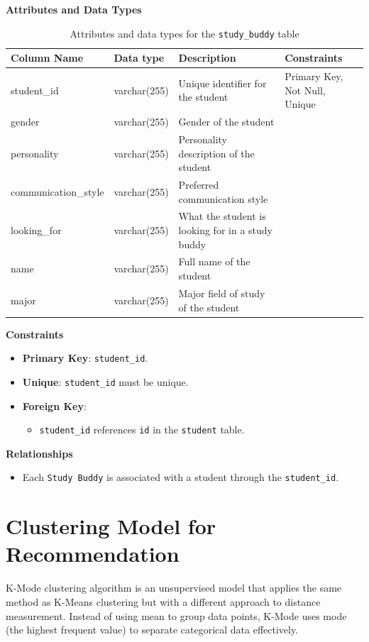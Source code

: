 \documentclass[12pt]{article}
\begin{document}
\textbf{Attributes and Data Types}
\begin{table}[H] 
    \centering 
    \renewcommand{\arraystretch}{1.5} 
    \begin{tabular}{|l|l|p{2.1cm}|l|} 
    \hline 
    \rowcolor[HTML]{96FFFB} 
    \textbf{Column Name} & \textbf{Data type} & \textbf{Description} & \textbf{Constraints} \\ \hline 
    student\_id & varchar(255) & Unique identifier for the student & Primary Key, Not Null, Unique \\ \hline 
    gender & varchar(255) & Gender of the student & \\ \hline 
    personality & varchar(255) & Personality description of the student & \\ \hline 
    communication\_style & varchar(255) & Preferred communication style & \\ \hline 
    looking\_for & varchar(255) & What the student is looking for in a study buddy & \\ \hline 
    name & varchar(255) & Full name of the student & \\ \hline 
    major & varchar(255) & Major field of study of the student & \\ \hline 
    \end{tabular} 
    \caption{Attributes and data types for the \texttt{study\_buddy} table} 
\end{table}

\noindent 
\textbf{Constraints} 
\begin{itemize} 
    \item \textbf{Primary Key}: \texttt{student\_id}. 
    \item \textbf{Unique}: \texttt{student\_id} must be unique. 
    \item \textbf{Foreign Key}: \begin{itemize} 
        \item \texttt{student\_id} references \texttt{id} in the \texttt{student} table. 
    \end{itemize} 
\end{itemize}

\noindent 
\textbf{Relationships} 
\begin{itemize} 
    \item Each \texttt{Study Buddy} is associated with a student through the \texttt{student\_id}. 
\end{itemize}

\pagebreak

\section{Clustering Model for Recommendation}
K-Mode clustering algorithm is an unsupervised model that applies the same method as K-Means clustering but with a different approach to distance measurement. Instead of using mean to group data points, K-Mode uses mode (the highest frequent value) to separate categorical data effectively.
\end{document}
